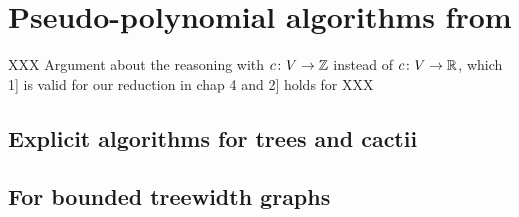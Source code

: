 	\section{Pseudo-polynomial algorithms from \mwcs{}}

		XXX Argument about the reasoning with $c\colon V \to \mathbb{Z}$ instead of $c\colon V \to \mathbb{R}$, which 1] is valid for our reduction in chap 4 and 2] holds for \bcmwcs{} XXX

		\subsection{Explicit algorithms for trees and cactii}

		\subsection{For bounded treewidth graphs}
